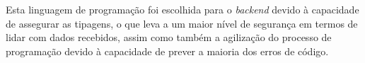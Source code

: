 Esta linguagem de programação foi escolhida para o \textit{backend} devido à capacidade de assegurar as tipagens, o que leva a um maior nível de segurança em termos de lidar com dados recebidos, assim como também a agilização do processo de programação devido à capacidade de prever a maioria dos erros de código.











